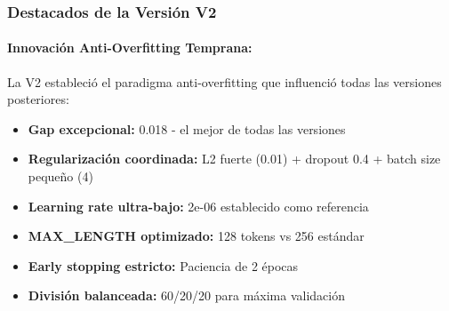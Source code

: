 \begin{table}[htbp]
\centering
{}
\caption{Métricas cuantificadas de mejora entre versiones experimentales consecutivas clave.}
\label{tab:metricas_mejora}
\end{table}

\subsubsection{Destacados de la Versión V2}

\paragraph{Innovación Anti-Overfitting Temprana:}
La V2 estableció el paradigma anti-overfitting que influenció todas las versiones posteriores:

\begin{itemize}
    \item \textbf{Gap excepcional:} 0.018 - el mejor de todas las versiones
    \item \textbf{Regularización coordinada:} L2 fuerte (0.01) + dropout 0.4 + batch size pequeño (4)
    \item \textbf{Learning rate ultra-bajo:} 2e-06 establecido como referencia
    \item \textbf{MAX\_LENGTH optimizado:} 128 tokens vs 256 estándar
    \item \textbf{Early stopping estricto:} Paciencia de 2 épocas
    \item \textbf{División balanceada:} 60/20/20 para máxima validación
\end{itemize}

